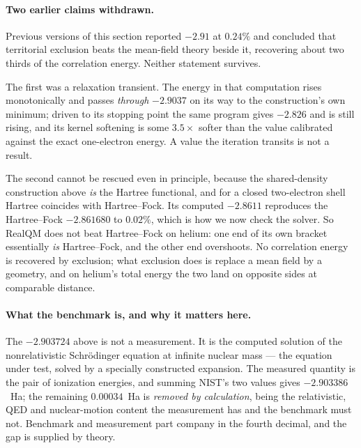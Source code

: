 \documentclass[11pt]{article}
\begin{document}
\paragraph{Two earlier claims withdrawn.} Previous versions of this section reported $-2.91$ at
$0.24\%$ and concluded that territorial exclusion beats the mean-field theory beside it, recovering
about two thirds of the correlation energy. Neither statement survives.

The first was a relaxation transient. The energy in that computation rises monotonically and passes
\emph{through} $-2.9037$ on its way to the construction's own minimum; driven to its stopping
point the same program gives $-2.826$ and is still rising, and its kernel softening is some
$3.5\times$ softer than the value calibrated against the exact one-electron energy. A value the
iteration transits is not a result.

The second cannot be rescued even in principle, because the shared-density construction above
\emph{is} the Hartree functional, and for a closed two-electron shell Hartree coincides with
Hartree--Fock. Its computed $-2.8611$ reproduces the Hartree--Fock $-2.861680$ to $0.02\%$, which
is how we now check the solver. So RealQM does not beat Hartree--Fock on helium: one end of its own
bracket essentially \emph{is} Hartree--Fock, and the other end overshoots. No correlation energy is
recovered by exclusion; what exclusion does is replace a mean field by a geometry, and on helium's
total energy the two land on opposite sides at comparable distance.

\paragraph{What the benchmark is, and why it matters here.} The $-2.903724$ above is not a
measurement. It is the computed solution of the nonrelativistic Schr\"odinger equation at infinite
nuclear mass --- the equation under test, solved by a specially constructed expansion. The measured
quantity is the pair of ionization energies, and summing NIST's two values gives $-2.903386$~Ha;
the remaining $0.00034$~Ha is \emph{removed by calculation}, being the relativistic, QED and
nuclear-motion content the measurement has and the benchmark must not. Benchmark and measurement
part company in the fourth decimal, and the gap is supplied by theory.
\end{document}
